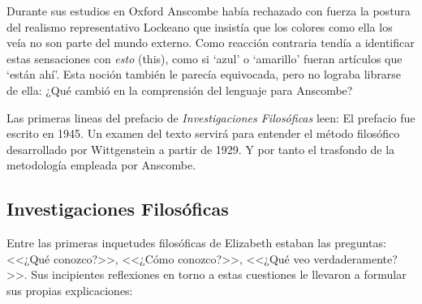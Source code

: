 Durante sus estudios en Oxford Anscombe había rechazado con fuerza la postura
del realismo representativo Lockeano que insistía que los colores como ella los
veía no son parte del mundo externo. Como reacción contraria tendía a
identificar estas sensaciones con \emph{esto} (this), como si `azul' o
`amarillo' fueran artículos que `están ahí'. Esta noción también le parecía
equivocada, pero no lograba librarse de ella\autocite{coradiamond}:
¿Qué cambió en la comprensión del lenguaje para Anscombe?

Las primeras lineas del prefacio de \emph{Investigaciones Filosóficas} leen:
 El prefacio fue escrito en 1945. Un examen del texto servirá
para entender el método filosófico desarrollado por Wittgenstein a partir de
1929. Y por tanto el trasfondo de la metodología empleada por Anscombe.

\subsection{Investigaciones Filosóficas}

Entre las primeras inquetudes filosóficas de Elizabeth estaban las preguntas:
<<¿Qué conozco?>>, <<¿Cómo conozco?>>, <<¿Qué veo verdaderamente?>>. Sus
incipientes reflexiones en torno a estas cuestiones le llevaron a formular sus
propias explicaciones:

